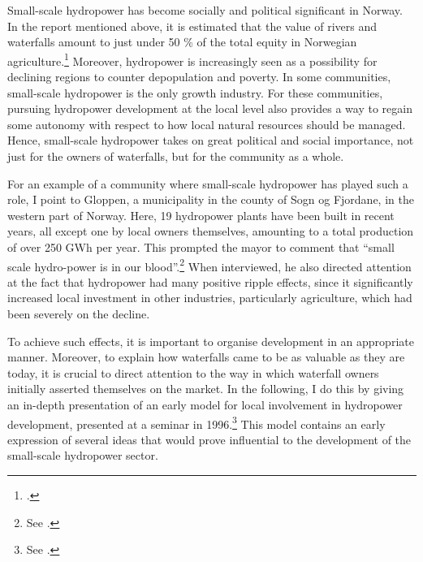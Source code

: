 Small-scale hydropower has become socially and political significant in Norway. In the report mentioned above, it is estimated that the value of rivers and waterfalls amount to just under 50 \% of the total equity in Norwegian agriculture.\footcite[1]{aanesland09} Moreover, hydropower is increasingly seen as a possibility for declining regions to counter depopulation and poverty. In some communities, small-scale hydropower is the only growth industry. For these communities, pursuing hydropower development at the local level also provides a way to regain some autonomy with respect to how local natural resources should be managed. Hence, small-scale hydropower takes on great political and social importance, not just for the owners of waterfalls, but for the community as a whole.

For an example of a community where small-scale hydropower has played such a role, I point to Gloppen, a municipality in the county of Sogn og Fjordane, in the western part of Norway. Here, 19 hydropower plants have been built in recent years, all except one by local owners themselves, amounting to a total production of over 250 GWh per year. This prompted the mayor to comment that ``small scale hydro-power is in our blood''.\footnote{See \cite{starheim12}.} When interviewed, he also directed attention at the fact that hydropower had many positive ripple effects, since it significantly increased local investment in other industries, particularly agriculture, which had been severely on the decline.

To achieve such effects, it is important to organise development in an appropriate manner. Moreover, to explain how waterfalls came to be as valuable as they are today, it is crucial to direct attention to the way in which waterfall owners initially asserted themselves on the market. In the following, I do this by giving an in-depth presentation of an early model for local involvement in hydropower development, presented at a seminar in 1996.\footnote{See \cite{dyrkolbotn96}.} This model contains an early expression of several ideas that would prove influential to the development of the small-scale hydropower sector.


